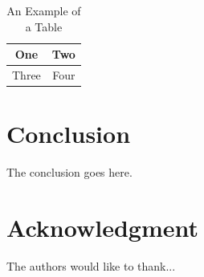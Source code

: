 \documentclass[10pt,conference]{IEEEtran}
\begin{document}
\begin{table}[!t]
\renewcommand{\arraystretch}{1.3}
\caption{An Example of a Table}
\label{table_example}
\centering
\begin{tabular}{|c||c|}
\hline
One & Two\\
\hline
Three & Four\\
\hline
\end{tabular}
\end{table}

\section{Conclusion}
The conclusion goes here.

\section*{Acknowledgment}
The authors would like to thank...



\end{document}

